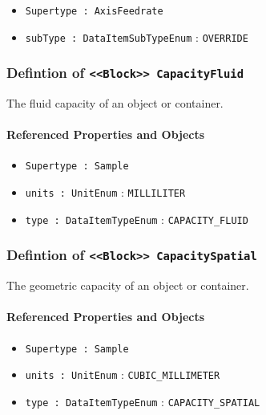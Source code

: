 \begin{itemize}
\item \texttt{Supertype : AxisFeedrate}

\item \texttt{subType : DataItemSubTypeEnum} : \texttt{OVERRIDE}

\end{itemize}
\FloatBarrier
\subsubsection{Defintion of \texttt{<<Block>> CapacityFluid}}
  \label{type:CapacityFluid}

\FloatBarrier

The fluid capacity of an object or container.

\FloatBarrier
\paragraph{Referenced Properties and Objects}

\begin{itemize}
\item \texttt{Supertype : Sample}

\item \texttt{units : UnitEnum} : \texttt{MILLILITER}

\item \texttt{type : DataItemTypeEnum} : \texttt{CAPACITY_FLUID}

\end{itemize}
\FloatBarrier
\subsubsection{Defintion of \texttt{<<Block>> CapacitySpatial}}
  \label{type:CapacitySpatial}

\FloatBarrier

The geometric capacity of an object or container.

\FloatBarrier
\paragraph{Referenced Properties and Objects}

\begin{itemize}
\item \texttt{Supertype : Sample}

\item \texttt{units : UnitEnum} : \texttt{CUBIC_MILLIMETER}

\item \texttt{type : DataItemTypeEnum} : \texttt{CAPACITY_SPATIAL}

\end{itemize}
\FloatBarrier
